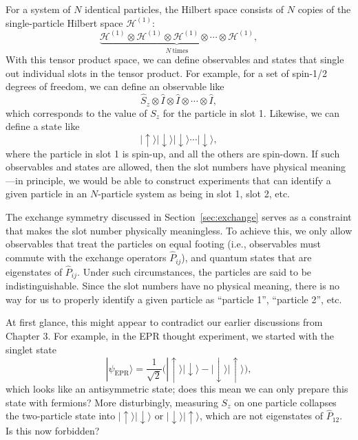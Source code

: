 \documentclass[prx,12pt]{revtex4-2}
\begin{document}
For a system of $N$ identical particles, the Hilbert space consists of
$N$ copies of the single-particle Hilbert space $\mathscr{H}^{(1)}$:
\begin{equation}
  \underbrace{\mathscr{H}^{(1)} \otimes \mathscr{H}^{(1)}
    \otimes \mathscr{H}^{(1)} \otimes \cdots
  \otimes \mathscr{H}^{(1)}}_{N~\mathrm{times}},
\end{equation}
With this tensor product space, we can define observables and states
that single out individual slots in the tensor product.  For example,
for a set of spin-1/2 degrees of freedom, we can define an observable
like
\begin{equation}
  \hat{S}_z \otimes \hat{I} \otimes \hat{I} \otimes \cdots \otimes \hat{I},
\end{equation}
which corresponds to the value of $S_z$ for the particle in slot 1.
Likewise, we can define a state like
\begin{equation}
  |\!\uparrow\rangle |\!\downarrow\rangle |\!\downarrow\rangle
  \cdots |\!\downarrow\rangle,
\end{equation}
where the particle in slot 1 is spin-up, and all the others are
spin-down.  If such observables and states are allowed, then the slot
numbers have physical meaning---in principle, we would be able to
construct experiments that can identify a given particle in an
$N$-particle system as being in slot 1, slot 2, etc.

The exchange symmetry discussed in Section~\ref{sec:exchange} serves
as a constraint that makes the slot number physically meaningless.  To
achieve this, we only allow observables that treat the particles on
equal footing (i.e., observables must commute with the exchange
operators $\hat{P}_{ij}$), and quantum states that are eigenstates of
$\hat{P}_{ij}$.  Under such circumstances, the particles are said to
be indistinguishable.  Since the slot numbers have no physical
meaning, there is no way for us to properly identify a given particle
as ``particle 1'', ``particle 2'', etc.

At first glance, this might appear to contradict our earlier
discussions from Chapter 3.  For example, in the EPR thought
experiment, we started with the singlet state
\begin{equation}
  |\psi_{\mathrm{EPR}}\rangle = \frac{1}{\sqrt{2}} \Big(|\!\uparrow\rangle |\!\downarrow\rangle
  - |\!\downarrow\rangle |\!\uparrow\rangle \Big),
  \label{EPR}
\end{equation}
which looks like an antisymmetric state; does this mean we can only
prepare this state with fermions?  More disturbingly, measuring
${S}_z$ on one particle collapses the two-particle state into
$|\!\uparrow\rangle |\!\downarrow\rangle$ or $|\!\downarrow\rangle
|\!\uparrow\rangle$, which are not eigenstates of $\hat{P}_{12}$.  Is
this now forbidden?
\end{document}
